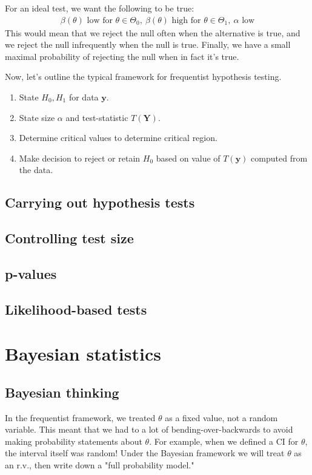 \documentclass[12pt]{article}
\begin{document}
\noindent For an ideal test, we want the following to be true:
\begin{align*}
    \beta(\theta) \text{ low for } \theta \in \Theta_0, \ \beta(\theta) \text{ high for } \theta \in \Theta_1, \ \alpha \text{ low}
\end{align*}
This would mean that we reject the null often when the alternative is true, and we reject the null infrequently when the null is true. Finally, we have a small maximal probability of rejecting the null when in fact it's true.

\medskip

\noindent Now, let's outline the typical framework for frequentist hypothesis testing.
\begin{enumerate}
  \item State $H_0, H_1$ for data $\textbf{y}$.
  \item State size $\alpha$ and test-statistic $T(\textbf{Y})$.
  \item Determine critical values to determine critical region.
  \item Make decision to reject or retain $H_0$ based on value of $T(\textbf{y})$ computed from the data.
\end{enumerate}

\subsection{Carrying out hypothesis tests}

\subsection{Controlling test size}

\subsection{p-values}

\subsection{Likelihood-based tests}

\section{Bayesian statistics}

\subsection{Bayesian thinking}
In the frequentist framework, we treated $\theta$ as a fixed value, not a random variable. This meant that we had to a lot of bending-over-backwards to avoid making probability statements about $\theta$. For example, when we defined a CI for $\theta$, the interval itself was random! Under the Bayesian framework we will treat $\theta$ as an r.v., then write down a "full probability model." 
\end{document}
